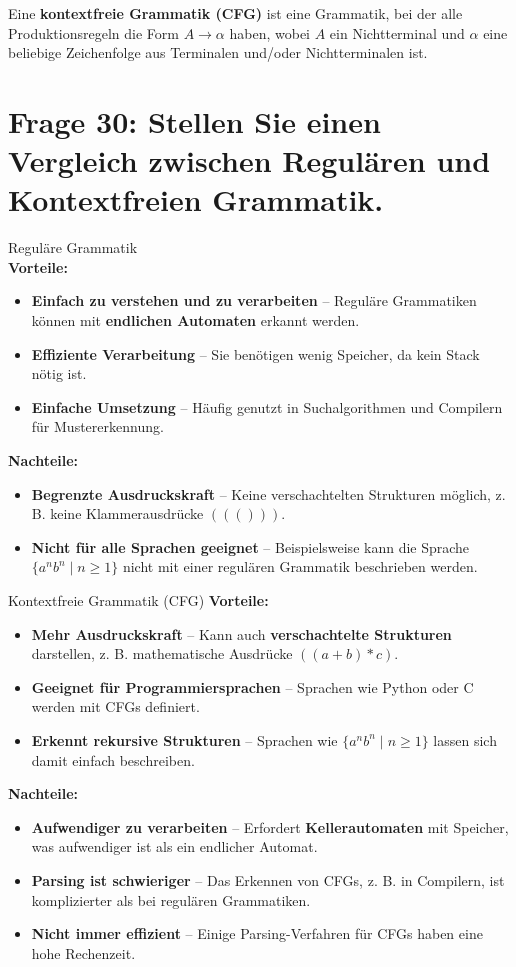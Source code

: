 \documentclass{article}
\begin{document}
Eine \textbf{kontextfreie Grammatik (CFG)} ist eine Grammatik, bei der alle Produktionsregeln die Form $A \rightarrow \alpha$ haben, wobei $A$ ein Nichtterminal und $\alpha$ eine beliebige Zeichenfolge aus Terminalen und/oder Nichtterminalen ist.

\section*{Frage 30: Stellen Sie einen Vergleich zwischen Regulären  und Kontextfreien Grammatik.}
{Reguläre Grammatik\\
\textbf{Vorteile:}
\begin{itemize}
	\item \textbf{Einfach zu verstehen und zu verarbeiten} – Reguläre Grammatiken können mit \textbf{endlichen Automaten} erkannt werden.
	\item \textbf{Effiziente Verarbeitung} – Sie benötigen wenig Speicher, da kein Stack nötig ist.
	\item \textbf{Einfache Umsetzung} – Häufig genutzt in Suchalgorithmen und Compilern für Mustererkennung.
\end{itemize}

\textbf{Nachteile:}\\
\begin{itemize}
	\item \textbf{Begrenzte Ausdruckskraft} – Keine verschachtelten Strukturen möglich, z. B. keine Klammerausdrücke $((()))$.
	\item \textbf{Nicht für alle Sprachen geeignet} – Beispielsweise kann die Sprache $\{ a^n b^n \mid n \geq 1 \}$ nicht mit einer regulären Grammatik beschrieben werden.
\end{itemize}

Kontextfreie Grammatik (CFG)
\textbf{Vorteile:}
\begin{itemize}
	\item \textbf{Mehr Ausdruckskraft} – Kann auch \textbf{verschachtelte Strukturen} darstellen, z. B. mathematische Ausdrücke $((a + b) * c)$.
	\item \textbf{Geeignet für Programmiersprachen} – Sprachen wie Python oder C werden mit CFGs definiert.
	\item \textbf{Erkennt rekursive Strukturen} – Sprachen wie $\{ a^n b^n \mid n \geq 1 \}$ lassen sich damit einfach beschreiben.
\end{itemize}

\textbf{Nachteile:}
\begin{itemize}
	\item \textbf{Aufwendiger zu verarbeiten} – Erfordert \textbf{Kellerautomaten} mit Speicher, was aufwendiger ist als ein endlicher Automat.
	\item \textbf{Parsing ist schwieriger} – Das Erkennen von CFGs, z. B. in Compilern, ist komplizierter als bei regulären Grammatiken.
	\item \textbf{Nicht immer effizient} – Einige Parsing-Verfahren für CFGs haben eine hohe Rechenzeit.
\end{itemize}

}
\end{document}
